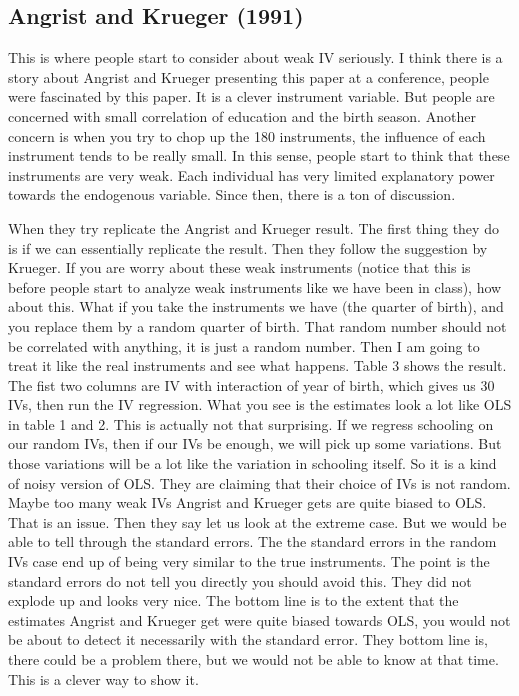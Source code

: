 \documentclass[11pt,a4paper]{amsart}
\theoremstyle{plain}
\theoremstyle{definition}
\begin{document}
\subsection{Angrist and Krueger (1991)}
	This is where people start to consider about weak IV seriously. I think there is a story about Angrist and Krueger presenting this paper at a conference, people were fascinated by this paper. It is a clever instrument variable. But people are concerned with small correlation of education and the birth season. Another concern is when you try to chop up the 180 instruments, the influence of each instrument tends to be really small. In this sense, people start to think that these instruments are very weak. Each individual has  very limited explanatory power towards the endogenous variable. Since then, there is a ton of discussion. \par 
	When they try replicate  the Angrist and Krueger result. The first thing they do is if we can essentially replicate the result. Then they follow the suggestion by Krueger. If you are worry about these weak instruments (notice that this is before people start to analyze weak instruments like we have been in class), how about this. What if you take the instruments we have (the quarter of birth), and you replace them by a random quarter of birth. That random number should not be correlated with anything, it is just a random number. Then I am going to treat it like the real instruments and see what happens. Table 3 shows the result. The fist two columns are IV with interaction of year of birth, which gives us 30 IVs, then run the IV regression. What you see is the estimates look a lot like OLS in table 1 and 2. This is actually not that surprising. If we regress schooling on our random IVs, then if our IVs be enough, we will pick up some variations. But those variations will be a lot like the variation in schooling itself. So it is a kind of noisy version of OLS. They are claiming that their choice of IVs is not random. Maybe too many weak IVs Angrist and Krueger gets are quite biased to OLS. That is an issue. Then they say let us look at the extreme case. But we would be able to tell through the standard errors. The the standard errors in the random IVs case end up of being very similar to the true instruments. The point is the standard errors do not tell you directly you should avoid this. They did not explode up and looks very nice. The bottom line is to the extent that the estimates Angrist and Krueger get were quite biased towards OLS, you would not be about to detect it necessarily with the standard error. They bottom line is, there could be a problem there, but we would not be able to know at that time. This is a clever way to show it. \par 
\end{document}
